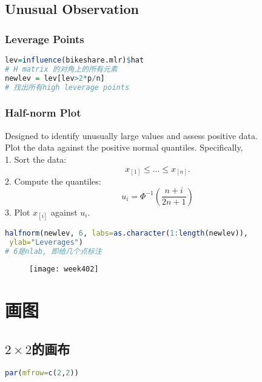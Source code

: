 \documentclass[11pt,a4paper]{article}
\begin{document}
\subsection{Unusual Observation}
\subsubsection{Leverage Points}
\begin{lstlisting}[language=R]
lev=influence(bikeshare.mlr)$hat
# H matrix 的对角上的所有元素
newlev = lev[lev>2*p/n]
# 找出所有high leverage points
\end{lstlisting}

\subsubsection{Half-norm Plot}
Designed to identify unusually large values and assess positive data.\\
Plot the data against the positive normal quantiles. Speciﬁcally,\\
1. Sort the data:
$$x_{[1]} \leq ... \leq x_{[n]}.$$
2. Compute the quantiles:
$$u_i=\Phi^{-1}(\frac{n+i}{2n+1})$$
3. Plot $x_{[i]}$ against $u_i$.
\begin{lstlisting}[language=R]
halfnorm(newlev, 6, labs=as.character(1:length(newlev)),
 ylab="Leverages")
# 6是nlab, 即给几个点标注
\end{lstlisting}
\begin{center}\begin{figure}[htbp]
  \centering
  \texttt{[image: week402]}
  \caption{}
  \label{}
\end{figure}\end{center}




























\section{画图}

\subsection{$2\times2$的画布}
\begin{lstlisting}[language=R]
par(mfrow=c(2,2))
\end{lstlisting}
\end{document}
